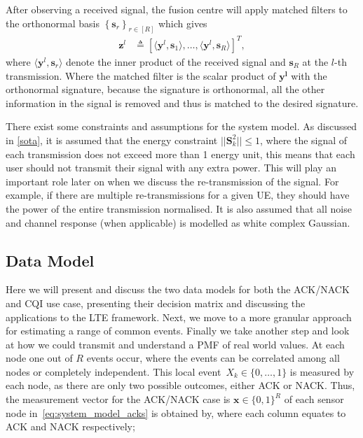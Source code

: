 \documentclass{article}
\begin{document}
After observing a received signal, the fusion centre will apply matched filters to the orthonormal basis $\left\{ \boldsymbol{s}_r\right\}_{r \in [R]}$ which gives
%
\begin{align}
    \boldsymbol{z}^l &\triangleq \left[\langle \boldsymbol{y}^l, \boldsymbol{s}_1\rangle, \ldots, \langle \boldsymbol{y}^l, \boldsymbol{s}_R\rangle  \right]^T, \label{eq:mf_output}
\end{align}
where $\langle \boldsymbol{y}^l, \boldsymbol{s}_r\rangle$ denote the inner product of the received signal and $\boldsymbol{s}_R$ at the $l$-th transmission. Where the matched filter is the scalar product of $\boldsymbol{y^l}$ with the orthonormal signature, because the signature is orthonormal, all the other information in the signal is removed and thus is matched to the desired signature.

There exist some constraints and assumptions for the system model. As discussed in \cref{sota}, it is assumed that the energy constraint $||\boldsymbol{S}_{k}^2|| \leq 1$, where the signal of each transmission does not exceed more than 1 energy unit, this means that each user should not transmit their signal with any extra power. This will play an important role later on when we discuss the re-transmission of the signal. For example, if there are multiple re-transmissions for a given \ac{UE}, they should have the power of the entire transmission normalised.  It is also assumed that all noise and channel response (when applicable) is modelled as white complex Gaussian.   

\subsection{Data Model}\label{data_models}

Here we will present and discuss the two data models for both the ACK/NACK and CQI use case, presenting their decision matrix and discussing the applications to the LTE framework. Next, we move to a more granular approach for estimating a range of common events. Finally we take another step and look at how we could transmit and understand a PMF of real world values. 
At each node one out of $R$ events occur, where the events can be correlated among all nodes or completely independent. This local event~${X_k \in \{0, \ldots, 1\}}$ is measured by each node, as there are only two possible outcomes, either ACK or NACK. Thus, the measurement vector for the ACK/NACK case is $\boldsymbol{x} \in \{0,1\}^{R}$ of each sensor node in~\cref{eq:system_model_acks} is obtained by, where each column equates to ACK and NACK respectively;
\end{document}
